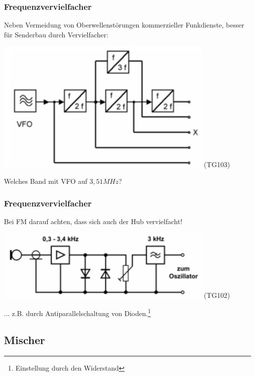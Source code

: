 \begin{frame}
    \frametitle{Frequenzvervielfacher}

    Neben Vermeidung von Oberwellenstörungen kommerzieller Funkdienste,
    besser für Senderbau durch Vervielfacher:

    \begin{center}
        \includegraphics[width=0.8\textwidth]{a13/TG103a.png}
        \tiny (TG103)
    \end{center}

    Welches Band mit VFO auf $3,51 MHz$? 

\end{frame}

\begin{frame}
    \frametitle{Frequenzvervielfacher}

    Bei FM darauf achten, dass sich auch der Hub vervielfacht!

    \begin{center}
        \includegraphics[width=0.8\textwidth]{a13/TG102.png}
        \tiny (TG102)
    \end{center}

    ... z.B. durch Antiparallelschaltung von Dioden.\footnote{Einstellung durch
    den Widerstand}

\end{frame}

\subsection{Mischer}

